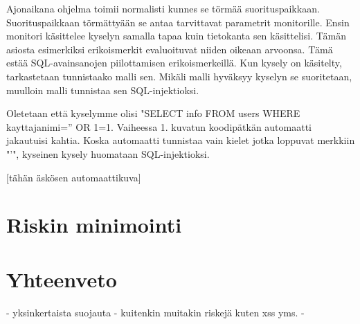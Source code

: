 \documentclass[finnish]{tktltiki2}
\theoremstyle{definition}
\theoremstyle{remark}
\begin{document}
\begin{enumerate}
		Ajonaikana ohjelma toimii normalisti kunnes se törmää suorituspaikkaan. Suorituspaikkaan törmättyään se antaa tarvittavat parametrit monitorille. Ensin monitori käsittelee kyselyn samalla tapaa kuin tietokanta sen käsittelisi. Tämän asiosta esimerkiksi erikoismerkit evaluoituvat niiden oikeaan arvoonsa. Tämä estää SQL-avainsanojen piilottamisen erikoismerkeillä. Kun kysely on käsitelty, tarkastetaan tunnistaako malli sen. Mikäli malli hyväksyy kyselyn se suoritetaan, muulloin malli tunnistaa sen SQL-injektioksi.
		
		Oletetaan että kyselymme olisi "SELECT info FROM users WHERE kayttajanimi='' OR 1=1. Vaiheessa 1. kuvatun koodipätkän automaatti jakautuisi kahtia. Koska automaatti tunnistaa vain kielet jotka loppuvat merkkiin "'", kyseinen kysely huomataan SQL-injektioksi.
		
		[tähän äskösen automaattikuva]
	\end{enumerate}
	\pagebreak
	\section {Riskin minimointi}
	\section {Yhteenveto}
	- yksinkertaista suojauta
	- kuitenkin muitakin riskejä kuten xss yms.
	- 

	
	
	
	
	
	
	
	
	
	
	
	
\end{document}
